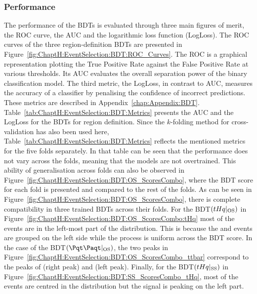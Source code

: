 \subsubsection{Performance}
\label{sec:ChaptH:EventSelection:BDT:Performance}
The performance of the BDTs is evaluated through three main figures of merit, the ROC 
curve, the AUC and 
the logarithmic loss function (LogLoss). 
The ROC curves of the three region-definition BDTs are presented 
in Figure~\ref{fig:ChaptH:EventSelection:BDT:ROC_Curves}.
The ROC is a graphical representation plotting the True Positive Rate against the 
False Positive Rate at various thresholds. Its AUC evaluates the overall separation
power of the binary classification model.
The third metric, the LogLoss, in contrast to AUC, measures the accuracy of a classifier 
by penalising the confidence of incorrect predictions.
These  metrics are described in Appendix~\ref{chap:Appendix:BDT}.
Table~\ref{tab:ChaptH:EventSelection:BDT:Metrics} presents the AUC and
the LogLoss for the BDTs for region definition. Since the $k$-folding method
for cross-validation has also been used here, Table~\ref{tab:ChaptH:EventSelection:BDT:Metrics}
reflects the mentioned metrics for the five folds separately.
In that table can be seen that the performance does
not vary across the folds, meaning that the models are not overtrained. 
This ability of generalisation across folds can also be observed in Figure~\ref{fig:ChaptH:EventSelection:BDT:OS_ScoresCombo},
where the BDT score for each fold is presented and compared to the rest of the folds. 
As can be seen in Figure~\ref{fig:ChaptH:EventSelection:BDT:OS_ScoresCombo}, there is 
complete compatibility in three trained BDTs across their folds. 
For the BDT$(tHq|_{\text{OS}})$ in Figure~\ref{fig:ChaptH:EventSelection:BDT:OS_ScoresCombo:tHq}
most of the events are in the left-most part of the distribution. This is because the \ttbar and \Zjets events
are grouped on the left side while the \tHq process is uniform across the BDT score. 
In the case of the BDT$(\ttbar|_{\text{OS}})$, the two peaks in Figure~\ref{fig:ChaptH:EventSelection:BDT:OS_ScoresCombo_ttbar}
correspond to the peaks of \ttbar (right peak) and \Zjets (left peak).
Finally, for the BDT$(tHq|_{\text{SS}})$ in Figure~\ref{fig:ChaptH:EventSelection:BDT:SS_ScoresCombo_tHq}, most of the events
are centred in the distribution but the \tHq signal is peaking on the left part.




